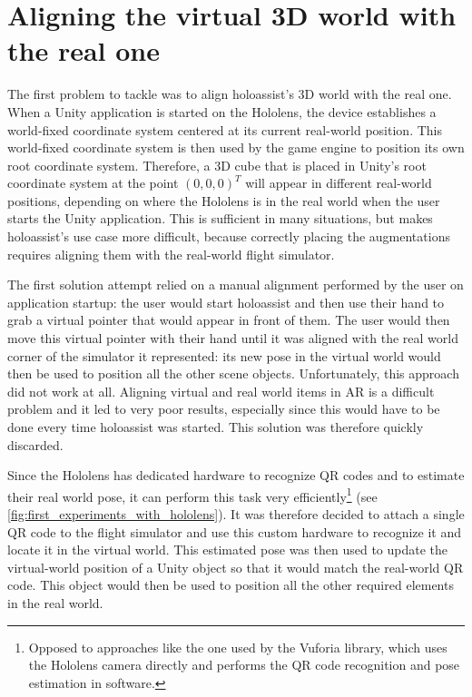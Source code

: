 \section{Aligning the virtual 3D world with the real one}\label{section:aligning_virtual_with_real_world}

The first problem to tackle was to align \gls{holoassist}'s 3D world with the real one. When a Unity application is started on the Hololens, the device establishes a world-fixed coordinate system centered at its current real-world position. This world-fixed coordinate system is then used by the game engine to position its own root coordinate system. Therefore, a 3D cube that is placed in Unity's root coordinate system at the point $(0, 0, 0)^T$ will appear in different real-world positions, depending on where the Hololens is in the real world when the user starts the Unity application. This is sufficient in many situations, but makes \gls{holoassist}'s use case more difficult, because correctly placing the augmentations requires aligning them with the real-world flight simulator.

The first solution attempt relied on a manual alignment performed by the user on application startup: the user would start \gls{holoassist} and then use their hand to grab a virtual pointer that would appear in front of them. The user would then move this virtual pointer with their hand until it was aligned with the real world corner of the simulator it represented: its new pose in the virtual world would then be used to position all the other scene objects. Unfortunately, this approach did not work at all. Aligning virtual and real world items in \gls{AR} is a difficult problem\cite{martin-gomez_augmented_2020} and it led to very poor results, especially since this would have to be done every time \gls{holoassist} was started. This solution was therefore quickly discarded.

Since the Hololens has dedicated hardware to recognize QR codes and to estimate their real world pose, it can perform this task very efficiently\footnote{Opposed to approaches like the one used by the Vuforia library\cite{ptc_inc_vuforia_nodate}, which uses the Hololens camera directly and performs the QR code recognition and pose estimation in software.} (see \autoref{fig:first_experiments_with_hololens}). It was therefore decided to attach a single QR code to the flight simulator and use this custom hardware to recognize it and locate it in the virtual world. This estimated pose was then used to update the virtual-world position of a Unity object so that it would match the real-world QR code. This object would then be used to position all the other required elements in the real world. 

